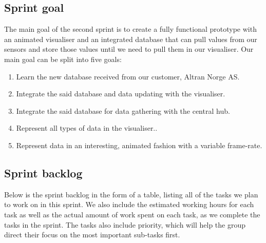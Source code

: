 \documentclass[../document]{subfiles}
\begin{document}
\subsection{Sprint goal}
The main goal of the second sprint is to create a fully functional prototype with an animated visualiser and an integrated database that can pull values from our sensors and store those values until we need to pull them in our visualiser. Our main goal can be split into five goals:
\begin{enumerate}
\item
Learn the new database received from our customer, Altran Norge AS.
\item
Integrate the said database and data updating with the visualiser.
\item
Integrate the said database for data gathering with the central hub.
\item
Represent all types of data in the visualiser..
\item
Represent data in an interesting, animated fashion with a variable frame-rate.
\end{enumerate}

\subsection{Sprint backlog}
Below is the sprint backlog in the form of a table, listing all of the tasks we plan to work on in this sprint. We also include the estimated working hours for each task as well as the actual amount of work spent on each task, as we complete the tasks in the sprint. The tasks also include priority, which will help the group direct their focus on the most important sub-tasks first.
\end{document}
